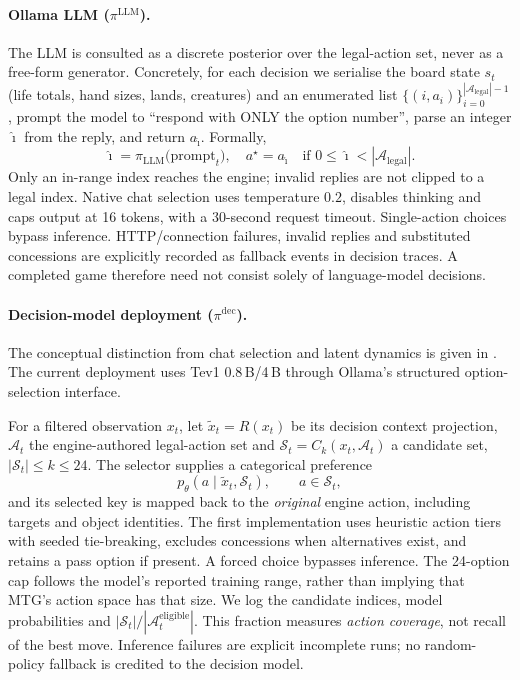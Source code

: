 \documentclass[11pt,a4paper]{article}
\theoremstyle{definition}
\theoremstyle{plain}
\begin{document}
\paragraph{Ollama LLM ($\pi^{\mathrm{LLM}}$).} The LLM is consulted as a discrete posterior over the legal-action set, never as a free-form generator. Concretely, for each decision we serialise the board state $s_t$ (life totals, hand sizes, lands, creatures) and an enumerated list $\{(i, a_i)\}_{i=0}^{|\mathcal{A}_{\mathrm{legal}}|-1}$, prompt the model to ``respond with ONLY the option number'', parse an integer $\hat\imath$ from the reply, and return $a_{\hat\imath}$. Formally,
\begin{equation*}
\hat\imath = \pi_{\mathrm{LLM}}\!\big(\mathrm{prompt}_t\big),\quad
a^\star = a_{\hat\imath}\quad\text{if }0\leq\hat\imath<|\mathcal{A}_{\mathrm{legal}}|.
\end{equation*}
Only an in-range index reaches the engine; invalid replies are not clipped
to a legal index. Native chat selection uses temperature $0.2$, disables
thinking and caps output at 16 tokens, with a 30-second request timeout.
Single-action choices bypass inference. HTTP/connection failures, invalid
replies and substituted concessions are explicitly recorded as fallback
events in decision traces. A completed game therefore need not consist
solely of language-model decisions.

\paragraph{Decision-model deployment ($\pi^{\mathrm{dec}}$).}
\label{sec:decision-models}
The conceptual distinction from chat selection and latent dynamics is
given in . The current deployment uses
Tev1 0.8\,B/4\,B through Ollama's structured option-selection interface.

For a filtered observation $x_t$, let $\tilde{x}_t=R(x_t)$ be its decision
context projection, $\mathcal{A}_t$ the engine-authored
legal-action set and $\mathcal{S}_t=C_k(x_t,\mathcal{A}_t)$ a candidate set,
$|\mathcal{S}_t|\leq k\leq24$. The selector supplies a categorical preference
\begin{equation*}
 p_\theta(a\mid \tilde{x}_t,\mathcal{S}_t),\qquad a\in\mathcal{S}_t,
\end{equation*}
and its selected key is mapped back to the \emph{original} engine action,
including targets and object identities. The first implementation uses
heuristic action tiers with seeded tie-breaking, excludes concessions
when alternatives exist, and retains a pass option if present. A forced
choice bypasses inference. The 24-option cap follows the model's reported
training range, rather than implying that MTG's action space has that size.
We log the candidate indices, model probabilities and
$|\mathcal{S}_t|/|\mathcal{A}_t^{\mathrm{eligible}}|$.
This fraction measures \emph{action coverage}, not recall of the best move.
Inference failures are explicit incomplete runs; no random-policy fallback
is credited to the decision model.
\end{document}
